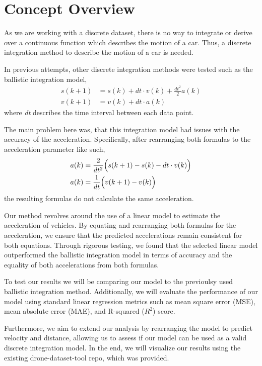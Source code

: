 \section{Concept Overview}
As we are working with a discrete dataset, there is no way to integrate or derive over a continuous function which describes the motion of a car. 
Thus, a discrete integration method to describe the motion of a car is needed. 

In previous attempts, other discrete integration methods were tested such as the ballistic integration model, 
\begin{align}
s(k+1) &= s(k) + dt \cdot v(k) + \frac{dt^2}{2} a(k) \\
v(k+1) &= v(k) + dt \cdot                       a(k)
\end{align}
where \textit{dt} describes the time interval between each data point.

The main problem here was, that this integration model had issues with the accuracy of the acceleration. 
Specifically, after rearranging both formulas to the acceleration parameter like such,
\begin{align}
    a(k) &= \frac{2}{dt^2} \Bigl( s(k+1) - s(k) - dt \cdot v(k) \Bigr)\\
    a(k) &= \frac{1}{dt} \Bigl( v(k+1) - v(k) \Bigr)
\end{align}
the resulting formulas do not calculate the same acceleration.

Our method revolves around the use of a linear model to estimate the acceleration of vehicles.
By equating and rearranging both formulas for the acceleration,
we ensure that the predicted accelerations remain consistent
for both equations.
Through rigorous testing, we found that the selected linear model outperformed the ballistic integration model in 
terms of accuracy and the equality of both accelerations from both formulas.

To test our results we will be comparing our model to the previoulsy used ballistic integration method.
Additionally, we will evaluate the performance of our model using standard linear regression metrics such as 
mean square error (MSE), mean absolute error (MAE), and R-squared ($R^2$) score.

Furthermore, we aim to extend our analysis by rearranging the model to predict velocity and distance, 
allowing us to assess if our model can be used as a valid discrete integration model.
In the end, we will visualize our results using the existing drone-dataset-tool repo, which was provided.

